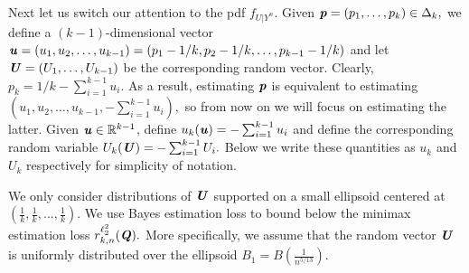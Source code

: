 \documentclass[11pt,onecolumn]{IEEEtran}
\def\mathbi#1{{\textbf{\textit #1}}}
\begin{document}
Next let us switch our attention to the pdf $f_{U|Y^n}$.  Given $\mathbi{p}=(p_1,\dots,p_k)\in\Delta_k,$ we define
a $(k-1)$-dimensional vector $\mathbi{u}=(u_1,u_2,\dots,u_{k-1})=(p_1-1/k,p_2-1/k,\dots,p_{k-1}-1/k)$
and let $\mathbi{U}=(U_1,\dots,U_{k-1})$ be the corresponding random vector.
Clearly, $p_k=1/k-\sum_{i=1}^{k-1} u_i.$ As a result, estimating $\mathbi{p}$ is equivalent to estimating $(u_1,u_2,\dots,u_{k-1},-\sum_{i=1}^{k-1} u_i),$ so from now on we will focus on estimating the latter. 
Given $\mathbi{u}\in\mathbb{R}^{k-1}$, define $u_k(\mathbi{u})=-\sum_{i=1}^{k-1} u_i$ and define the corresponding random variable
$U_k(\mathbi{U})=-\sum_{i=1}^{k-1} U_i.$ Below we write these quantities as $u_k$ and $U_k$ respectively for simplicity of notation.

We only consider distributions of $\mathbi{U}$ supported on a small ellipsoid centered at $(\frac{1}{k},\frac{1}{k},\dots,\frac{1}{k}).$ We use Bayes estimation loss to bound below the minimax estimation loss $r_{k,n}^{\ell_2^2} (\mathbi{Q}).$ More specifically, 
we assume that the random vector $\mathbi{U}$ is uniformly distributed over the ellipsoid
$
B_1=B ( \frac{1}{n^{5/13}}).
$
\end{document}
